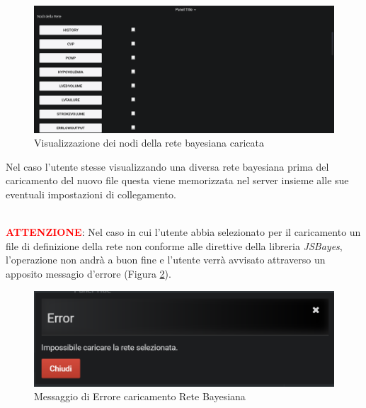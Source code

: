\begin{figure}[H]
	\begin{center}
		\includegraphics[scale=0.35]{./images/NodiRete.png}
		 \caption{Visualizzazione dei nodi della rete bayesiana caricata}	
		 \label{NodiRete}
	\end{center}
\end{figure}

Nel caso l'utente stesse visualizzando una diversa rete bayesiana prima del caricamento del nuovo file questa viene memorizzata nel server insieme alle sue eventuali impostazioni di collegamento.

~\\
\textbf{\textcolor{red}{ATTENZIONE}}: Nel caso in cui l'utente abbia selezionato per il caricamento un file di definizione della rete non conforme alle direttive della libreria \textit{JSBayes}, l'operazione non andrà a buon fine e l'utente verrà avvisato attraverso un apposito messagio d'errore (Figura \ref{ErroreUpRete}).

\begin{figure}[H]
	\begin{center}
		\includegraphics[scale=0.6]{./images/ErroreUpRete.png}
		 \caption{Messaggio di Errore caricamento Rete Bayesiana}	
		 \label{ErroreUpRete}
	\end{center}
\end{figure}

